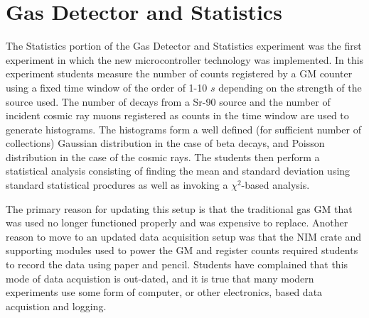 \section{Gas Detector and Statistics}
The Statistics portion of the Gas Detector and Statistics experiment was the first experiment in which the new microcontroller technology was implemented.
In this experiment students measure the number of counts registered by a GM counter using a fixed time window of the order of 1-10 $s$ depending on the strength of the source used.
The number of decays from a Sr-90 source and the number of incident cosmic ray muons registered as counts in the time window are used to generate histograms.
The histograms form a well defined (for sufficient number of collections) Gaussian distribution in the case of beta decays, and Poisson distribution in the case of the cosmic rays.
The students then perform a statistical analysis consisting of finding the mean and standard deviation using standard statistical procdures as well as invoking a $\chi^2$-based analysis.

The primary reason for updating this setup is that the traditional gas GM that was used no longer functioned properly and was expensive to replace.
Another reason to move to an updated data acquisition setup was that the NIM crate and supporting modules used to power the GM and register counts required students to record the data using paper and pencil.
Students have complained that this mode of data acquistion is out-dated, and it is true that many modern experiments use some form of computer, or other electronics, based data acquistion and logging.


